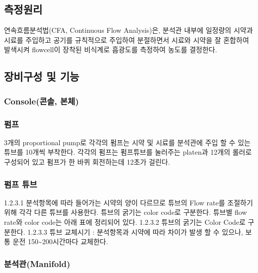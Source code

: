 \documentclass[
]{book}
\begin{document}
\hypertarget{uxce21uxc815uxc6d0uxb9ac}{%
\subsection{측정원리}\label{uxce21uxc815uxc6d0uxb9ac}}

연속흐름분석법(CFA, Continuous Flow Analysis)은, 분석관 내부에 일정량의 시약과 시료를 주입하고 공기를 규칙적으로 주입하여 분절하면서 시료와 시약을 잘 혼합하여 발색시켜 flowcell이 장착된 비식계로 흡광도를 측정하여 농도를 결정한다.

\hypertarget{uxc7a5uxbe44uxad6cuxc131-uxbc0f-uxae30uxb2a5}{%
\subsection{장비구성 및 기능}\label{uxc7a5uxbe44uxad6cuxc131-uxbc0f-uxae30uxb2a5}}

\hypertarget{consoleuxcf58uxc194-uxbcf8uxccb4}{%
\subsubsection{Console(콘솔, 본체)}\label{consoleuxcf58uxc194-uxbcf8uxccb4}}

\hypertarget{uxd38cuxd504}{%
\subsubsection{펌프}\label{uxd38cuxd504}}

3개의 proportional pump로 각각의 펌프는 시약 및 시료를 분석관에 주입 할 수 있는 튜브를 10개씩 부착한다. 각각의 펌프는 펌프튜브를 눌러주는 platen과 12개의 롤러로 구성되어 있고 펌프가 한 바퀴 회전하는데 12초가 걸린다.

\hypertarget{uxd38cuxd504-uxd29cuxbe0c}{%
\subsubsection{펌프 튜브}\label{uxd38cuxd504-uxd29cuxbe0c}}

1.2.3.1 분석항목에 따라 들어가는 시약의 양이 다르므로 튜브의 Flow rate를 조절하기 위해 각각 다른 튜브를 사용한다. 튜브의 굵기는 color code로 구분한다. 튜브별 flow rate와 color code는 아래 표에 정리되어 있다.
1.2.3.2 튜브의 굵기는 Color Code로 구분한다.
1.2.3.3 튜브 교체시기 : 분석항목과 시약에 따라 차이가 발생 할 수 있으나, 보통 운전 150\textasciitilde200시간마다 교체한다.

\hypertarget{uxbd84uxc11duxad00manifold}{%
\subsubsection{분석관(Manifold)}\label{uxbd84uxc11duxad00manifold}}
\end{document}
